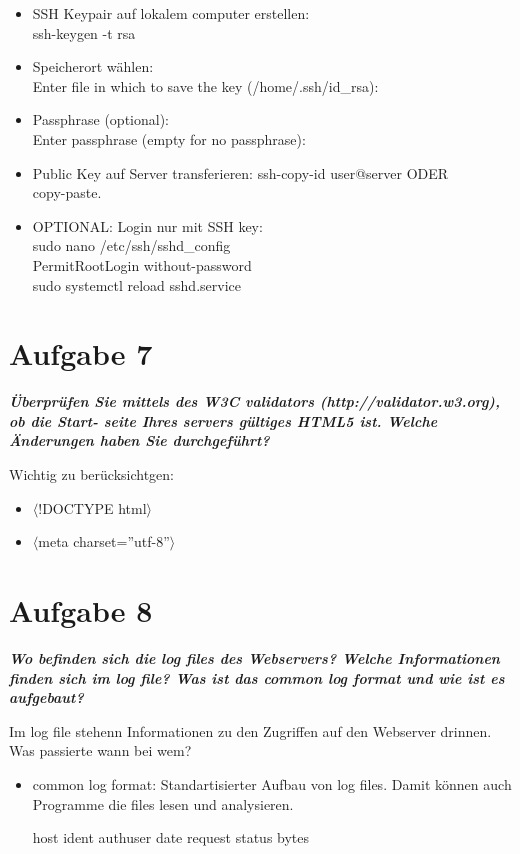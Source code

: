 \documentclass[12pt, a4paper]{report}
\begin{document}
\begin{itemize}
	\item SSH Keypair auf lokalem computer erstellen:\\
	ssh-keygen -t rsa
	\item Speicherort wählen:\\
	Enter file in which to save the key (/home/.ssh/id\_rsa):
	\item Passphrase (optional):\\
	Enter passphrase (empty for no passphrase):
	\item Public Key auf Server transferieren:
	ssh-copy-id user@server ODER \\
	copy-paste.
	\item OPTIONAL: Login nur mit SSH key:\\
	sudo nano /etc/ssh/sshd\_config\\
	PermitRootLogin without-password\\
	sudo systemctl reload sshd.service
\end{itemize}

\section*{Aufgabe 7}{\tiny }
\textbf{\textit{Überprüfen Sie mittels des W3C validators (http://validator.w3.org), ob die Start-
seite Ihres servers gültiges HTML5 ist. Welche Änderungen haben Sie durchgeführt?}}

Wichtig zu berücksichtgen:
\begin{itemize}
	\item $\langle$!DOCTYPE html$\rangle$
	\item $\langle$meta charset=''utf-8''$\rangle$
\end{itemize}

\section*{Aufgabe 8}
\textbf{\textit{Wo befinden sich die log files des Webservers? Welche Informationen finden sich im log file? Was ist das common log format und wie ist es aufgebaut?}}

Im log file stehenn Informationen zu den Zugriffen auf den Webserver drinnen. Was passierte wann bei wem?
\begin{itemize}
	\item common log format:
	Standartisierter Aufbau von log files. Damit können auch Programme die files lesen und analysieren.
	
	host ident authuser date request status bytes
\end{itemize}
\end{document}
